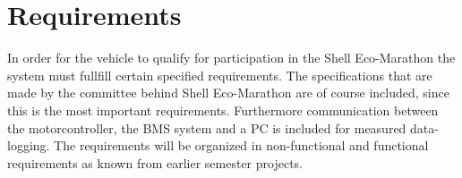 \chapter{Requirements}
\label{sec:requirements}
In order for the vehicle to qualify for participation in the Shell Eco-Marathon the system must fullfill certain specified requirements. The specifications that are made by the committee behind Shell Eco-Marathon are of course included, since this is the most important requirements. Furthermore communication between the motorcontroller, the BMS system and a PC is included for measured data-logging. The requirements will be organized in non-functional and functional requirements as known from earlier semester projects.\\


\pagebreak

\pagebreak